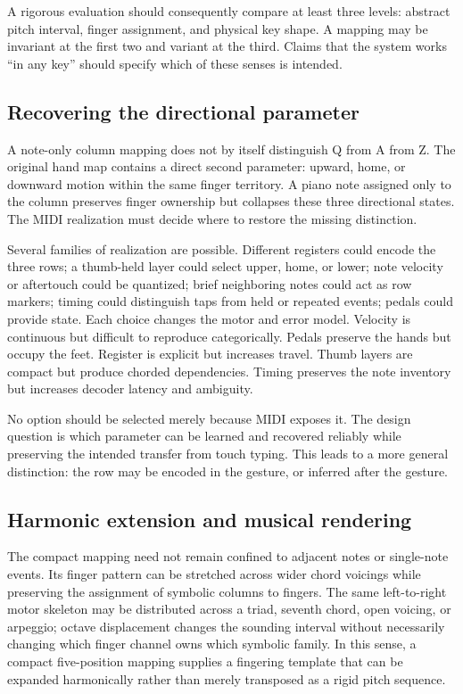 \documentclass[11pt]{article}
\begin{document}
A rigorous evaluation should consequently compare at least three levels: abstract pitch interval, finger assignment, and physical key shape. A mapping may be invariant at the first two and variant at the third. Claims that the system works ``in any key'' should specify which of these senses is intended.

\subsection{Recovering the directional parameter}

A note-only column mapping does not by itself distinguish Q from A from Z. The original hand map contains a direct second parameter: upward, home, or downward motion within the same finger territory. A piano note assigned only to the column preserves finger ownership but collapses these three directional states. The MIDI realization must decide where to restore the missing distinction.

Several families of realization are possible. Different registers could encode the three rows; a thumb-held layer could select upper, home, or lower; note velocity or aftertouch could be quantized; brief neighboring notes could act as row markers; timing could distinguish taps from held or repeated events; pedals could provide state. Each choice changes the motor and error model. Velocity is continuous but difficult to reproduce categorically. Pedals preserve the hands but occupy the feet. Register is explicit but increases travel. Thumb layers are compact but produce chorded dependencies. Timing preserves the note inventory but increases decoder latency and ambiguity.

No option should be selected merely because MIDI exposes it. The design question is which parameter can be learned and recovered reliably while preserving the intended transfer from touch typing. This leads to a more general distinction: the row may be encoded in the gesture, or inferred after the gesture.

\subsection{Harmonic extension and musical rendering}

The compact mapping need not remain confined to adjacent notes or single-note events. Its finger pattern can be stretched across wider chord voicings while preserving the assignment of symbolic columns to fingers. The same left-to-right motor skeleton may be distributed across a triad, seventh chord, open voicing, or arpeggio; octave displacement changes the sounding interval without necessarily changing which finger channel owns which symbolic family. In this sense, a compact five-position mapping supplies a fingering template that can be expanded harmonically rather than merely transposed as a rigid pitch sequence.
\end{document}
